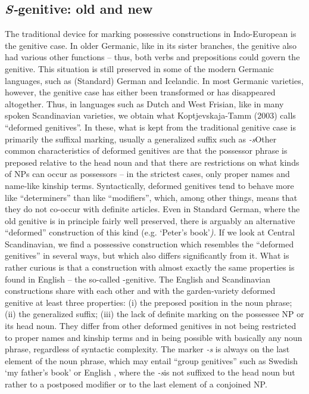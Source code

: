 \subsection[S{}-genitive: old and new]{\textit{S-}genitive: old and new}
The traditional device for marking possessive constructions in Indo-European is the genitive case. In older Germanic, like in its sister branches, the genitive also had various other functions – thus, both verbs and prepositions could govern the genitive. This situation is still preserved in some of the modern Germanic languages, such as (Standard) German and Icelandic. In most Germanic varieties, however, the genitive case has either been transformed or has disappeared altogether. Thus, in languages such as Dutch and West Frisian, like in many spoken Scandinavian varieties, we obtain what Koptjevskaja-Tamm (2003) calls “deformed genitives”. In these, what is kept from the traditional genitive case is primarily the suffixal marking, usually a generalized suffix such as\textit{ {}-s}Other common characteristics of deformed genitives are that the possessor phrase is preposed relative to the head noun and that there are restrictions on what kinds of NPs can occur as possessors – in the strictest cases, only proper names and name-like kinship terms. Syntactically, deformed genitives tend to behave more like “determiners” than like “modifiers”, which, among other things, means that they do not co-occur with definite articles. Even in Standard German, where the old genitive is in principle fairly well preserved, there is arguably an alternative “deformed” construction of this kind (e.g. ‘Peter’s book’\textit{).} If we look at Central Scandinavian, we find a possessive construction which resembles the “deformed genitives” in several ways, but which also differs significantly from it. What is rather curious is that a construction with almost exactly the same properties is found in English – the so-called -genitive. The English and Scandinavian constructions share with each other and with the garden-variety deformed genitive at least three properties: (i) the preposed position in the noun phrase; (ii) the generalized suffix; (iii) the lack of definite marking on the possessee NP or its head noun. They differ from other deformed genitives in not being restricted to proper names and kinship terms and in being possible with basically any noun phrase, regardless of syntactic complexity. The marker\textit{ {}-s} is always on the last element of the noun phrase, which may entail “group genitives” such as Swedish  ‘my father’s book’ or English , where the\textit{ {}-s}\textstyleLinguisticExample{ }is not suffixed to the head noun but rather to a postposed modifier or to the last element of a conjoined NP. 

